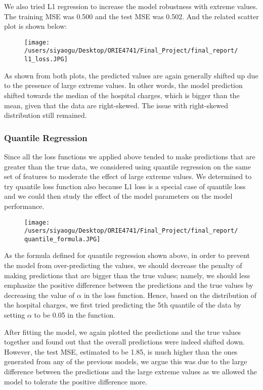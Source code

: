 \documentclass[journal, a4paper,11pt]{IEEEtran}
\begin{document}
	We also tried L1 regression to increase the model robustness with extreme values. The training MSE was 0.500 and the test MSE was 0.502. And the related scatter plot is shown below:
	
	\begin{figure}[ht]
	\centering
	\texttt{[image: /users/siyaogu/Desktop/ORIE4741/Final\_Project/final\_report/l1\_loss.JPG]}
	\end{figure}
	
	
	As shown from both plots, the predicted values are again generally shifted up due to the presence of large extreme values. In other words, the model prediction shifted towards the median of the hospital charges, which is bigger than the mean, given that the data are right-skewed. The issue with right-skewed distribution still remained.
	
\subsubsection{Quantile Regression}
	Since all the loss functions we applied above tended to make predictions that are greater than the true data, we considered using quantile regression on the same set of features to moderate the effect of large extreme values. We determined to try quantile loss function also because L1 loss is a special case of quantile loss and we could then study the effect of the model parameters on the model performance. 
	
	\begin{figure}[ht]
	\centering
	\texttt{[image: /users/siyaogu/Desktop/ORIE4741/Final\_Project/final\_report/quantile\_formula.JPG]}
	\end{figure}
	
	As the formula defined for quantile regression shown above, in order to prevent the model from over-predicting the values, we should decrease the penalty of making predictions that are bigger than the true values; namely, we should less emphasize the positive difference between the predictions and the true values by decreasing the value of $\alpha$ in the loss function. Hence, based on the distribution of the hospital charges, we first tried predicting the 5th quantile of the data by setting $\alpha$ to be 0.05 in the function. 
	
	After fitting the model, we again plotted the predictions and the true values together and found out that the overall predictions were indeed shifted down. However, the test MSE, estimated to be 1.85, is much higher than the ones generated from any of the previous models, we argue this was due to the large difference between the predictions and the large extreme values as we allowed the model to tolerate the positive difference more.
	
\end{document}
